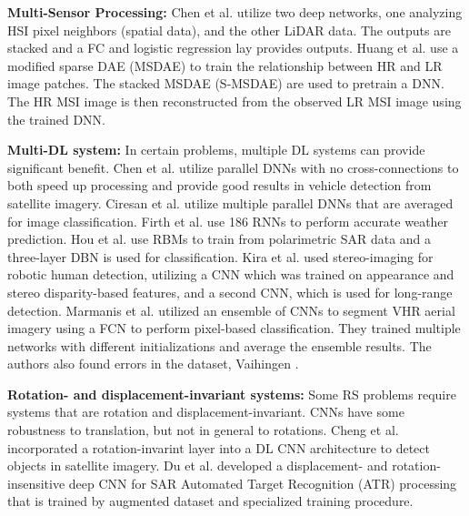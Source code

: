 \documentclass[12pt]{spieman}
\begin{document}
\begin{spacing}{1}
%
%
\textbf{Multi-Sensor Processing:} Chen et al. \cite{Chen2016DeepFusion} utilize two deep networks, one analyzing HSI pixel neighbors (spatial data), and the other LiDAR data. The outputs are stacked and a FC and logistic regression lay provides outputs. Huang et al. \cite{huang2015new} use a modified sparse DAE (MSDAE) to train the relationship between HR and LR image patches. The stacked MSDAE (S-MSDAE) are used to pretrain a DNN. The HR MSI image is then reconstructed from the observed LR MSI image using the trained DNN.


%
%
\textbf{Multi-DL system:} In certain problems, multiple DL systems can provide significant benefit. Chen et al. \cite{chen2014vehicle} utilize parallel DNNs with no cross-connections to both speed up processing and provide good results in vehicle detection from satellite imagery. Ciresan et al. \cite{Ciresan2012} utilize multiple parallel DNNs that are averaged for image classification. Firth et al. \cite{firth2016novel} use 186 RNNs to perform accurate weather prediction. Hou et al. \cite{Hou2015Polarimetric} use RBMs to train from polarimetric SAR data and a three-layer DBN is used for classification. Kira et al. \cite{Kira2012} used stereo-imaging for robotic human detection, utilizing a CNN which was trained on appearance and stereo disparity-based features, and a second CNN, which is used for long-range detection. Marmanis et al. \cite{Marmanis2016Semantic} utilized an ensemble of CNNs to segment VHR aerial imagery using a FCN to perform pixel-based classification. They trained multiple networks with different initializations and average the ensemble results. The authors also found errors in the dataset, Vaihingen \cite{rottensteiner2012isprs} .


%
%
\textbf{Rotation- and displacement-invariant systems:} Some RS problems require systems that are rotation and displacement-invariant. CNNs have some robustness to translation, but not in general to rotations. Cheng et al. \cite{Cheng2016Learning} incorporated a rotation-invarint layer into a DL CNN architecture to detect objects in satellite imagery. Du et al. \cite{du2016sar} developed a displacement- and rotation-insensitive deep CNN for SAR Automated Target Recognition (ATR) processing that is trained by augmented dataset and specialized training procedure.



\end{spacing}
\end{document}
